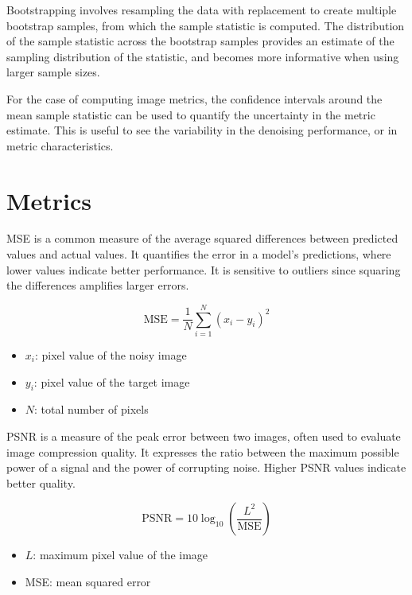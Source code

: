 Bootstrapping involves resampling the data with replacement to create multiple bootstrap samples, from which the sample statistic is computed. The distribution of the sample statistic across the bootstrap samples provides an estimate of the sampling distribution of the statistic, and becomes more informative when using larger sample sizes.

For the case of computing image metrics, the confidence intervals around the mean sample statistic can be used to quantify the uncertainty in the metric estimate. This is useful to see the variability in the denoising performance, or in metric characteristics.


\section{Metrics}\label{sec:metrics}

\Gls{MSE} is a common measure of the average squared differences between predicted values and actual values. It quantifies the error in a model’s predictions, where lower values indicate better performance. It is sensitive to outliers since squaring the differences amplifies larger errors.

\begin{note}
    {}
    \begin{equation}\label{eq:mse}
        \text{MSE} = \frac{1}{N} \sum_{i=1}^{N} (x_i - y_i)^2
    \end{equation}
    \begin{itemize}
        \item $x_i$: pixel value of the noisy image
        \item $y_i$: pixel value of the target image
        \item $N$: total number of pixels
    \end{itemize}
\end{note}

\Gls{PSNR} is a measure of the peak error between two images, often used to evaluate image compression quality. It expresses the ratio between the maximum possible power of a signal and the power of corrupting noise. Higher PSNR values indicate better quality.

\begin{note}
    {}
    \begin{equation}    
        \text{PSNR} = 10 \log_{10} \left( \frac{L^2}{\text{MSE}} \right)
    \end{equation}
    \begin{itemize}
        \item $L$: maximum pixel value of the image
        \item \gls{MSE}: mean squared error
    \end{itemize}
\end{note}


